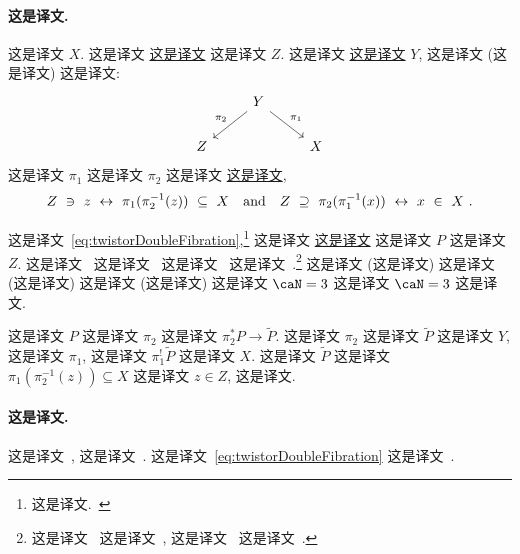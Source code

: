 \documentclass[
    affil-it, %
    auth-lg, %
    british, %
    compression, %
    contents, %
    custom-packages={}, %
    references={bigone}, %
]{lib/preprint}
\begin{document}
\begin{body}
        \paragraph{这是译文.}  这是译文 $X$. 这是译文 \uline{这是译文} 这是译文 $Z$. 这是译文 \uline{这是译文} $Y$, 这是译文 (这是译文) 这是译文:         \begin{equation}\label{eq:twistorDoubleFibration}
            \begin{tikzcd}
                & Y\arrow[dl,"\pi_2",swap] \arrow[dr,"\pi_1"]
                \\
                Z & & X
            \end{tikzcd}
        \end{equation}  这是译文 $\pi_1$ 这是译文 $\pi_2$ 这是译文 \uline{这是译文},         \begin{equation}
            Z\ \ni\ z\ \leftrightarrow\ \pi_1(\pi_2^{-1}(z))\ \subseteq\ X 
            \eand
            Z\ \supseteq\ \pi_2(\pi_1^{-1}(x))\ \leftrightarrow\ x\ \in\ X~.
        \end{equation}
        
这是译文~\eqref{eq:twistorDoubleFibration},\footnote{这是译文.~\cite{Eastwood:1985aa}} 这是译文 \uline{这是译文} 这是译文 $P$ 这是译文 $Z$. 这是译文~\cite{Ward:1977ta,Hitchin:1982gh} 这是译文~\cite{Witten:2003nn,Popov:2004rb,Popov:2005uv} 这是译文~\cite{Isenberg:1978kk,Witten:1978xx,Khenkin:1980ff,Pool:1981aa,Buchdahl:1985aa,Popov:2021mfl} 这是译文~\cite{Witten:1978xx,Saemann:2005ji,Saemann:2012rr}.\footnote{这是译文~\cite{Penrose:1976js,Atiyah:1978wi} 这是译文~\cite{Merkulov:1992,Wolf:2007tx,Mason:2007ct}, 这是译文~\cite{0264-9381-2-4-020} 这是译文~\cite{Merkulov:1992qa}.} 这是译文 (这是译文) 这是译文 (这是译文) 这是译文 (这是译文) 这是译文 $\caN=3$ 这是译文 $\caN=3$ 这是译文.
        
 这是译文 $P$ 这是译文 $\pi_2$ 这是译文 $\pi_2^*P\rightarrow\tilde P$. 这是译文 $\pi_2$ 这是译文 $\tilde P$ 这是译文 $Y$, 这是译文 $\pi_1$, 这是译文 $\pi_1^!\tilde P$ 这是译文 $X$. 这是译文 $\tilde P$ 这是译文 $\pi_1(\pi_2^{-1}(z))\subseteq X$ 这是译文 $z\in Z$, 这是译文.
        
        \paragraph{这是译文.}
这是译文~\cite{Saemann:2011nb,Mason:2011nw}, 这是译文~\cite{Saemann:2011nb,Saemann:2012uq,Saemann:2013pca,Jurco:2014mva,Jurco:2016qwv,Samann:2017dah}. 这是译文~\eqref{eq:twistorDoubleFibration} 这是译文~\cite{Jurco:2016qwv}. 
        

\end{body}
\end{document}
